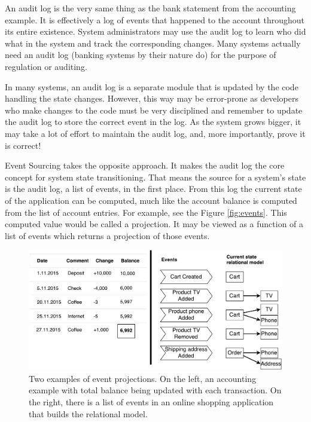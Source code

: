 \documentclass{book}
\begin{document}
An audit log is the very same thing as the bank statement from the
accounting example. It is effectively a log of events that happened to
the account throughout its entire existence. System administrators may
use the audit log to learn who did what in the system and track the
corresponding changes. Many systems actually need an audit log (banking
systems by their nature do) for the purpose of regulation or auditing.

In many systems, an audit log is a separate module that is updated by
the code handling the state changes. However, this way may be
error-prone as developers who make changes to the code must be very
disciplined and remember to update the audit log to store the correct
event in the log. As the system grows bigger, it may take a lot of
effort to maintain the audit log, and, more importantly, prove it is
correct!

Event Sourcing takes the opposite approach. It makes the audit log the
core concept for system state transitioning. That means the source for a
system's state is the audit log, a list of events, in the first place.
From this log the current state of the application can be computed, much
like the account balance is computed from the list of account entries.
For example, see the Figure \ref{fig:events}. This computed value would
be called a projection. It may be viewed as a function of a list of
events which returns a projection of those events.


\begin{figure}[h!]
\begin{center}
\includegraphics[width=0.98\columnwidth]{figures/events/events}
\caption{Two examples of event projections. On the left, an accounting example
with total balance being updated with each transaction. On the right,
there is a list of events in an online shopping application that builds
the relational model.%
}
\end{center}
\end{figure}
\end{document}
